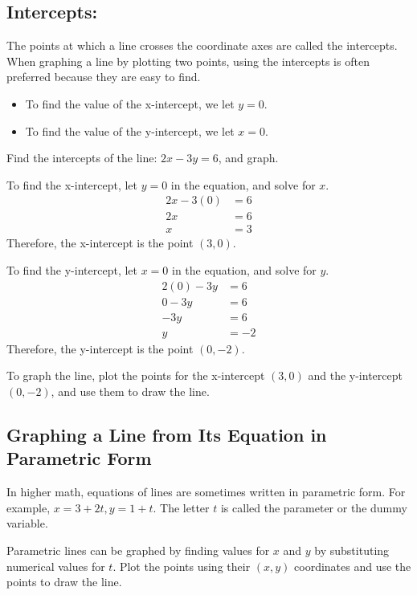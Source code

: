 \subsection{Intercepts:} The points at which a line crosses the coordinate axes are called the intercepts. When graphing a line by plotting two points, using the intercepts is often preferred because they are easy to find.
\begin{itemize}
    \item To find the value of the x-intercept, we let $y = 0$.
    \item To find the value of the y-intercept, we let $x = 0$.
\end{itemize}

\begin{example}
Find the intercepts of the line: $2x - 3y = 6$, and graph.
\end{example}

\begin{solution} To find the x-intercept, let $y = 0$ in the equation, and solve for $x$.
\begin{align*}
2x - 3(0) &= 6 \\
2x &= 6 \\
x &= 3
\end{align*}
Therefore, the x-intercept is the point $(3, 0)$.

To find the y-intercept, let $x = 0$ in the equation, and solve for $y$.
\begin{align*}
2(0) - 3y &= 6 \\
0 - 3y &= 6 \\
-3y &= 6 \\
y &= -2
\end{align*}
Therefore, the y-intercept is the point $(0, -2)$.

To graph the line, plot the points for the x-intercept $(3, 0)$ and the y-intercept $(0, -2)$, and use them to draw the line.

\end{solution}
\subsection{Graphing a Line from Its Equation in Parametric Form}

In higher math, equations of lines are sometimes written in parametric form. For example, $x = 3 + 2t, y = 1 + t$. The letter $t$ is called the parameter or the dummy variable.

Parametric lines can be graphed by finding values for $x$ and $y$ by substituting numerical values for $t$. Plot the points using their $(x, y)$ coordinates and use the points to draw the line.

